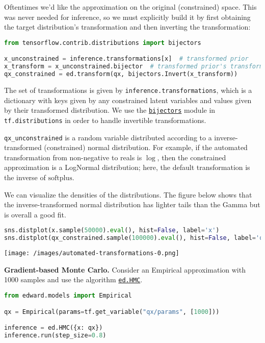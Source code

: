 Oftentimes we'd like the approximation on the original (constrained)
space. This was never needed for inference, so we must explicitly
build it by first obtaining the target distribution's transformation
and then inverting the transformation:

\begin{lstlisting}[language=Python]
from tensorflow.contrib.distributions import bijectors

x_unconstrained = inference.transformations[x]  # transformed prior
x_transform = x_unconstrained.bijector  # transformed prior's transformation
qx_constrained = ed.transform(qx, bijectors.Invert(x_transform))
\end{lstlisting}

The set of transformations is given by
\texttt{inference.transformations}, which is a dictionary with keys
given by any constrained latent variables and values given by their
transformed distribution. We use the
\href{https://www.tensorflow.org/api_docs/python/tf/distributions/bijectors}{\texttt{bijectors}}
module in \texttt{tf.distributions} in order to handle invertible
transformations.

\texttt{qx\_unconstrained} is a random variable distributed
according to a inverse-transformed (constrained) normal distribution.
For example, if the automated transformation from non-negative to
reals is $\log$, then the constrained approximation is a LogNormal
distribution; here, the default transformation is the inverse of
$\textrm{softplus}$.

We can visualize the densities of the distributions.
The figure below shows that the inverse-transformed normal
distribution has lighter tails than the Gamma but is overall a
good fit.

\begin{lstlisting}[language=Python]
sns.distplot(x.sample(50000).eval(), hist=False, label='x')
sns.distplot(qx_constrained.sample(100000).eval(), hist=False, label='qx')
\end{lstlisting}

\texttt{[image: /images/automated-transformations-0.png]}

\textbf{Gradient-based Monte Carlo.}
Consider an Empirical approximation with 1000 samples
and use the algorithm \href{/api/ed/HMC}{\texttt{ed.HMC}}.

\begin{lstlisting}[language=Python]
from edward.models import Empirical

qx = Empirical(params=tf.get_variable("qx/params", [1000]))

inference = ed.HMC({x: qx})
inference.run(step_size=0.8)
\end{lstlisting}

